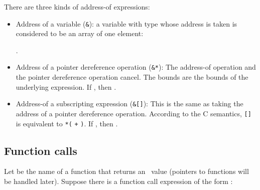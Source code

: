 There are three kinds of address-of expressions:
\begin{itemize}
\item Address of a variable (\lstinline|&|): a variable  with type  
whose address is taken is considered to be an array of one element:

            {}.
            
\item Address of a pointer dereference operation (\lstinline|&*|):
The address-of operation and the pointer dereference operation cancel. 
The bounds are the bounds of the underlying expression. 
If , then
.

\item Address-of a subscripting expression (\lstinline|&|\lstinline|[|\lstinline|]|):
This is the same as taking the address of a pointer dereference operation.
According to the C semantics, \lstinline|[|\lstinline|]| is equivalent
to \lstinline|*(| \lstinline|+| \lstinline|)|.  If 
, then
.
\end{itemize}
   
\subsection{Function calls}
\label{section:inferring-bounds-for-function-calls}

Let  be the name of a function that returns an
\arrayptr\ value (pointers to functions will be handled later).
Suppose there is a function call expression of the form
\code{(}\code{)}:

